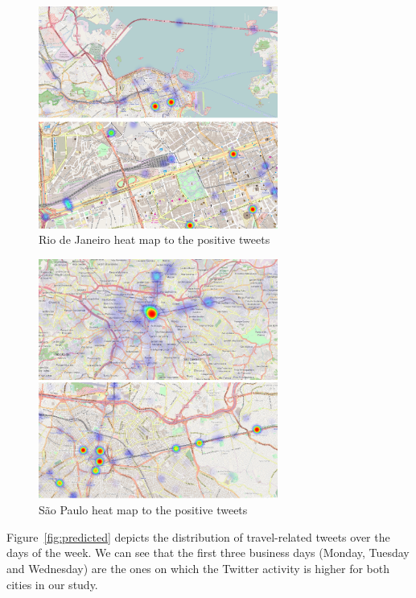 \begin{figure}[!bp]
	\centering
	\includegraphics[width=0.7\textwidth]{figures/rio_1}
	\caption{Rio de Janeiro heat map to the positive tweets}
	\label{subfig:rio_heatmap}
\end{figure}

\begin{figure}[!htp]
	\centering
	\includegraphics[width=0.7\textwidth]{figures/sp_1}
	\caption{São Paulo heat map to the positive tweets}
	\label{subfig:sp_heatmap}
\end{figure}

Figure~\ref{fig:predicted} depicts the distribution of travel-related tweets over the days of the week. We can see that the first three business days (Monday, Tuesday and Wednesday) are the ones on which the Twitter activity is higher for both cities in our study.

